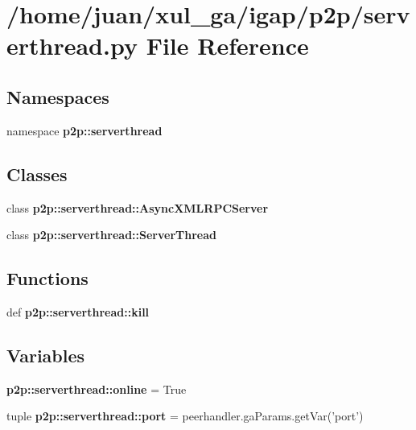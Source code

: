 \section{/home/juan/xul\_\-ga/igap/p2p/serverthread.py File Reference}
\label{serverthread_8py}
\subsection*{Namespaces}
\begin{CompactItemize}
\item 
namespace {\bf p2p::serverthread}
\end{CompactItemize}
\subsection*{Classes}
\begin{CompactItemize}
\item 
class {\bf p2p::serverthread::AsyncXMLRPCServer}
\item 
class {\bf p2p::serverthread::ServerThread}
\end{CompactItemize}
\subsection*{Functions}
\begin{CompactItemize}
\item 
def {\bf p2p::serverthread::kill}
\end{CompactItemize}
\subsection*{Variables}
\begin{CompactItemize}
\item 
{\bf p2p::serverthread::online} = True
\item 
tuple {\bf p2p::serverthread::port} = peerhandler.gaParams.getVar('port')
\end{CompactItemize}
